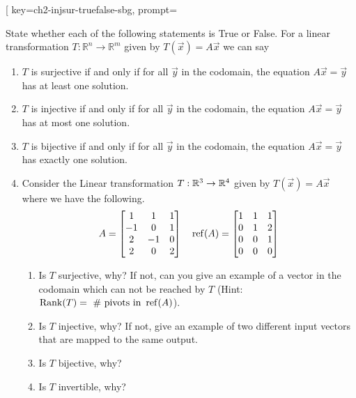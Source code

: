 \begin{SaveQuestion}[
        key=ch2-injsur-truefalse-sbg,
        prompt={State whether each of the following statements is True or False. For a linear transformation $T:\mathbb{R}^n \rightarrow \mathbb{R}^m$ given by $T(\vec x)=A\vec x$ we can say \begin{enumerate} \item  $T$ is surjective if and only if for all $\vec y$ in the codomain, the equation $A \vec x = \vec y$ has at least one solution. \item $T$ is injective if and only if for all $\vec y$ in the codomain, the equation $A\vec x = \vec y$ has at most one solution. \item $T$ is bijective if and only if for all $\vec y$ in the codomain, the equation $A\vec x = \vec y$ has exactly one solution. 
        \item Consider the Linear transformation $T:\mathbb{R}^3\to \mathbb{R}^4$ given by $T(\vec x) = A \vec x$ where we have the following.
        $$A= \begin{bmatrix} 1 & 1 & 1 \\ -1 & 0 & 1 \\ 2 & -1 & 0 \\ 2 & 0 & 2 \\ \end{bmatrix} \quad \operatorname{ref}(A) = \begin{bmatrix} 1 & 1 & 1\\ 0 & 1 & 2\\ 0 & 0 & 1\\ 0 & 0 & 0\\ \end{bmatrix}$$ \begin{enumerate} \item Is $T$ surjective, why? If not, can you give an example of a vector in the codomain which can not be reached by $T$ (Hint: $\operatorname{Rank}(T) = \text{ \# pivots in } \operatorname{ref}(A)$).  \item Is $T$ injective, why? If not, give an example of two different input vectors that are mapped to the same output. \item Is $T$ bijective, why? \item Is $T$ invertible, why? \end{enumerate}

\end{enumerate}}
\end{SaveQuestion}
